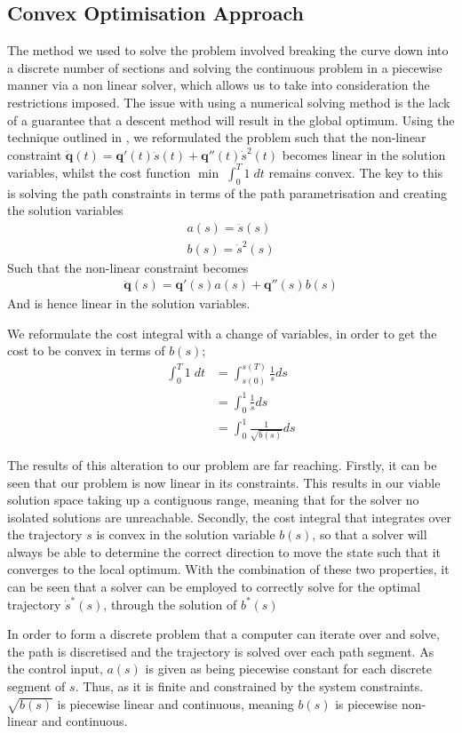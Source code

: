 \subsection{Convex Optimisation Approach}
The method we used to solve the problem involved breaking the curve down into a discrete number of sections and solving the continuous problem in a piecewise manner via a non linear solver, which allows us to take into consideration the restrictions imposed.
The issue with using a numerical solving method is the lack of a guarantee that a descent method will result in the global optimum. Using the technique outlined in \cite{Schutter09}, we reformulated the problem such that the non-linear constraint $\ddot{\textbf{q}}(t) = \textbf{q}'(t)\ddot{s}(t) + \textbf{q}''(t)\dot{s}^2(t)$ becomes linear in the solution variables, whilst the cost function  $ \min \; \int_0^T1\;dt$ remains convex.
The key to this is solving the path constraints in terms of the path parametrisation and creating the solution variables
\begin{align*}
a(s) = \ddot{s}(s)\\
b(s) = \dot{s}^2(s)
\end{align*}
Such that the non-linear constraint becomes
\begin{align*}
\ddot{\textbf{q}}(s) = \textbf{q}'(s)a(s) + \textbf{q}''(s)b(s)
\end{align*}
And is hence linear in the solution variables.

We reformulate the cost integral with a change of variables, in order to get the cost to be convex in terms of $b(s)$;
\begin{align*}
\int_0^T1\;dt &= \int_{s(0)}^{s(T)} \frac{1}{\dot{s}}ds\\
	&= \int_0^1\frac{1}{\dot{s}}ds\\
	&= \int_0^1\frac{1}{\sqrt{b(s)}}ds
\end{align*}

The results of this alteration to our problem are far reaching. Firstly, it can be seen that our problem is now linear in its constraints. This results in our viable solution space taking up a contiguous range, meaning that for the solver no isolated solutions are unreachable.
Secondly, the cost integral that integrates over the trajectory $s$ is convex in the solution variable $b(s)$, so that a solver will always be able to determine the correct direction to move the state such that it converges to the local optimum.
With the combination of these two properties, it can be seen that a solver can be employed to correctly solve for the optimal trajectory $\dot{s}^*(s)$, through the solution of $b^*(s)$

In order to form a discrete problem that a computer can iterate over and solve, the path is discretised and the trajectory is solved over each path segment. As the control input, $a(s)$ is given as being piecewise constant for each discrete segment of $s$. Thus, as it is finite and constrained by the system constraints. $\sqrt{b(s)}$ is piecewise linear and continuous, meaning $b(s)$ is piecewise non-linear and continuous. 
